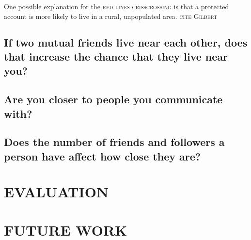 \documentclass{sig-alternate}
\begin{document}
One possible explanation for the \textsc{red lines crisscrossing} is that a protected account is more likely to live in a rural, unpopulated area. \textsc{cite Gilbert}

\subsection{If two mutual friends live near each other, does that increase the chance that they live near you?}


\subsection{Are you closer to people you communicate with?}

\subsection{Does the number of friends and followers a person have affect how close they are?}








\section{EVALUATION}
\section{FUTURE WORK}


 
\end{document}
